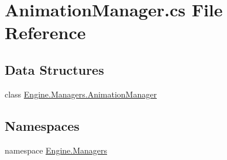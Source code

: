 \hypertarget{a00002}{}\section{Animation\+Manager.\+cs File Reference}
\label{a00002}
\subsection*{Data Structures}
\begin{DoxyCompactItemize}
\item 
class \hyperlink{a00298}{Engine.\+Managers.\+Animation\+Manager}
\end{DoxyCompactItemize}
\subsection*{Namespaces}
\begin{DoxyCompactItemize}
\item 
namespace \hyperlink{a00239}{Engine.\+Managers}
\end{DoxyCompactItemize}
